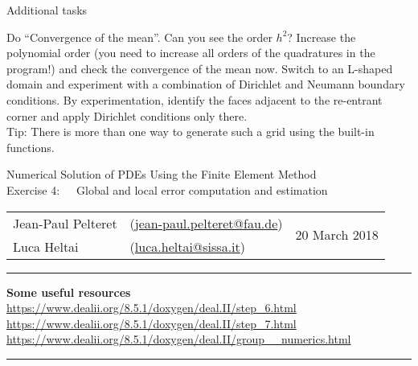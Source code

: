 \documentclass[11pt]{exam}
\makeatletter
\newcommand{\makeheader}[3]{%
\setcounter{question}{0}
\begin{center}
{\sc Numerical Solution of PDEs Using the Finite Element Method}\vspace{2ex}\\
{\sc Exercise #1:\ \ \ #2}\vspace{2ex}\\
\begin{tabular*}{\textwidth}{ll @{\extracolsep{\fill}}r}
Jean-Paul Pelteret & (\url{jean-paul.pelteret@fau.de}) & \multirow{2}{*}{#3} \\
Luca Heltai & (\url{luca.heltai@sissa.it}) & \\
\end{tabular*}
\end{center}
}
\newcommand{\makeresources}[1]{%
\rule{\textwidth}{0.6mm}
\textbf{Some useful resources}\\[1.5ex]
#1 \par
\rule{\textwidth}{0.6mm}
}
\makeatother
\begin{document}
\begin{questions}

\question Additional tasks
\begin{parts}
\bonuspart Do ``Convergence of the mean''. Can you see the order $h^{2}$? 
\bonuspart Increase the polynomial order (you need to increase all orders of the quadratures in the program!) and check the convergence of the mean now.
\bonuspart Switch to an L-shaped domain and experiment with a combination of Dirichlet and Neumann boundary conditions. 
By experimentation, identify the faces adjacent to the re-entrant corner and apply Dirichlet conditions only there. \\
Tip: There is more than one way to generate such a grid using the built-in functions. 
\end{parts}

\end{questions}



\clearpage
\makeheader{4}{Global and local error computation and estimation}{20 March 2018}
\makeresources{%
\url{https://www.dealii.org/8.5.1/doxygen/deal.II/step_6.html} \\
\url{https://www.dealii.org/8.5.1/doxygen/deal.II/step_7.html} \\
\url{https://www.dealii.org/8.5.1/doxygen/deal.II/group__numerics.html}
}
\end{document}
